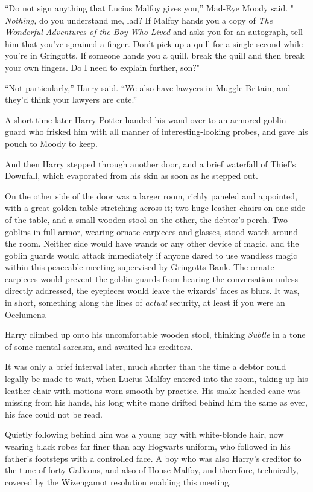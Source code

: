 ``Do not sign anything that Lucius Malfoy gives you,'' Mad-Eye Moody
said. " \emph{Nothing,} do you understand me, lad? If Malfoy hands you a
copy of \emph{The Wonderful Adventures of the Boy-Who-Lived} and asks
you for an autograph, tell him that you've sprained a finger. Don't pick
up a quill for a single second while you're in Gringotts. If someone
hands you a quill, break the quill and then break your own fingers. Do I
need to explain further, son?"

``Not particularly,'' Harry said. ``We also have lawyers in Muggle
Britain, and they'd think your lawyers are cute.''

A short time later Harry Potter handed his wand over to an armored
goblin guard who frisked him with all manner of interesting-looking
probes, and gave his pouch to Moody to keep.

And then Harry stepped through another door, and a brief waterfall of
Thief's Downfall, which evaporated from his skin as soon as he stepped
out.

On the other side of the door was a larger room, richly paneled and
appointed, with a great golden table stretching across it; two huge
leather chairs on one side of the table, and a small wooden stool on the
other, the debtor's perch. Two goblins in full armor, wearing ornate
earpieces and glasses, stood watch around the room. Neither side would
have wands or any other device of magic, and the goblin guards would
attack immediately if anyone dared to use wandless magic within this
peaceable meeting supervised by Gringotts Bank. The ornate earpieces
would prevent the goblin guards from hearing the conversation unless
directly addressed, the eyepieces would leave the wizards' faces as
blurs. It was, in short, something along the lines of \emph{actual}
security, at least if you were an Occlumens.

Harry climbed up onto his uncomfortable wooden stool, thinking
\emph{Subtle} in a tone of some mental sarcasm, and awaited his
creditors.

It was only a brief interval later, much shorter than the time a debtor
could legally be made to wait, when Lucius Malfoy entered into the room,
taking up his leather chair with motions worn smooth by practice. His
snake-headed cane was missing from his hands, his long white mane
drifted behind him the same as ever, his face could not be read.

Quietly following behind him was a young boy with white-blonde hair, now
wearing black robes far finer than any Hogwarts uniform, who followed in
his father's footsteps with a controlled face. A boy who was also
Harry's creditor to the tune of forty Galleons, and also of House
Malfoy, and therefore, technically, covered by the Wizengamot resolution
enabling this meeting.

